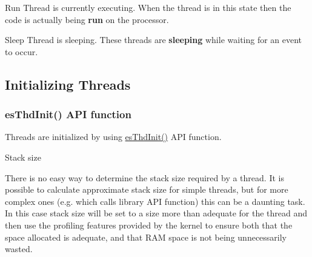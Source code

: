 \begin{DoxyParagraph}{Run}
Thread is currently executing. When the thread is in this state then the code is actually being {\bfseries run} on the processor.
\end{DoxyParagraph}
\begin{DoxyParagraph}{Sleep}
Thread is sleeping. These threads are {\bfseries sleeping} while waiting for an event to occur.
\end{DoxyParagraph}
\hypertarget{threads_thd_create}{}\subsection{Initializing Threads}\label{threads_thd_create}
\hypertarget{threads_thd_create_init}{}\subsubsection{es\-Thd\-Init() A\-P\-I function}\label{threads_thd_create_init}
Threads are initialized by using \hyperlink{group__kern__thd_gac91734f3ee867b519f59bf81cc7fde88}{es\-Thd\-Init()} A\-P\-I function.

\begin{DoxyParagraph}{Stack size}

\end{DoxyParagraph}
There is no easy way to determine the stack size required by a thread. It is possible to calculate approximate stack size for simple threads, but for more complex ones (e.\-g. which calls library A\-P\-I function) this can be a daunting task. In this case stack size will be set to a size more than adequate for the thread and then use the profiling features provided by the kernel to ensure both that the space allocated is adequate, and that R\-A\-M space is not being unnecessarily wasted. 